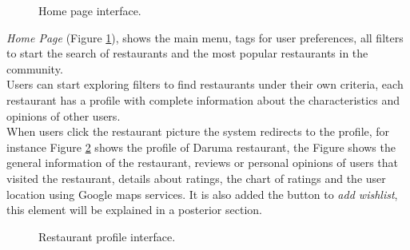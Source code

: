 \begin{figure}
\captionsetup{font=footnotesize}
\centering
{}
\caption{Home page interface.}
\label{fig:home-page}   
\end{figure}
\textit{Home Page} (Figure  \ref{fig:home-page}), shows the main
menu, tags for user preferences, all filters to start the search of
restaurants and the most popular restaurants in the community. \\ 
Users can start exploring filters to find restaurants under their own
criteria, each restaurant has a profile with complete information
about the characteristics and opinions of other users. \\ When users
click the restaurant picture the system redirects to the profile, for
instance Figure  \ref{fig:rest-profile2}  shows the profile of Daruma
restaurant, the Figure  shows the general information of the
restaurant, reviews or personal opinions of users that visited the
restaurant, details about ratings, the chart of ratings and the user
location using Google maps services. It is also added the button to
\textit{add wishlist}, this element will be explained in a posterior
section.
\begin{figure}
\captionsetup{font=footnotesize}
\centering
{}
\caption{Restaurant profile interface.}
\label{fig:rest-profile2}   
\end{figure}

